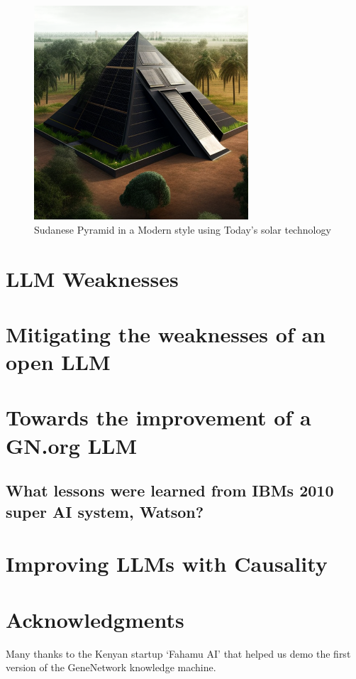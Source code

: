 \documentclass[letterpaper]{article}
\begin{document}
\begin{figure}[ht]
\includegraphics[width=8cm]{imgs/Sudanese_Solar_Pyramid.png}
\caption{Sudanese Pyramid in a Modern style using Today's solar technology}
\end{figure}

\section{LLM Weaknesses}

\section{Mitigating the weaknesses of an open LLM}

\section{Towards the improvement of a GN.org LLM}
\subsection{What lessons were learned from IBMs 2010 super AI system, Watson?}
\section{Improving LLMs with Causality} %

\section{ Acknowledgments}
Many thanks to the Kenyan startup `Fahamu AI' that helped us demo the first version of the GeneNetwork knowledge machine.


\begin{small}


\end{small}
\end{document}

